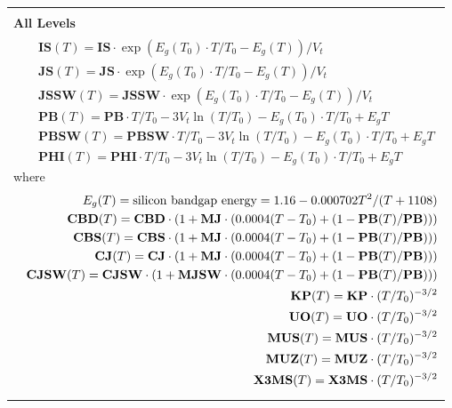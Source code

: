 


\small
\begin{longtable}[H]{>{\setlength{\hsize}{\textwidth}}W}
\hline \\
\bf All Levels \\

\begin{eqnarray*}
&& \mathbf{IS}(T) = \mathbf{IS}\cdot\exp\left(E_g(T_0)\cdot
T/T_0 - E_g(T)\right)/V_t \\
&& \mathbf{JS}(T) = \mathbf{JS}\cdot\exp\left(E_g(T_0)\cdot
T/T_0 - E_g(T)\right)/V_t \\
&& \mathbf{JSSW}(T) = \mathbf{JSSW}\cdot\exp\left(E_g(T_0)\cdot
T/T_0 - E_g(T)\right)/V_t \\
&& \mathbf{PB}(T) = \mathbf{PB}\cdot T/T_0 - 3V_t\ln(T/T_0) -
E_g(T_0)\cdot T/T_0 + E_g{T} \\
&& \mathbf{PBSW}(T) = \mathbf{PBSW}\cdot T/T_0 - 3V_t\ln(T/T_0) -
E_g(T_0)\cdot T/T_0 + E_g{T} \\
&& \mathbf{PHI}(T) = \mathbf{PHI}\cdot T/T_0 - 3V_t\ln(T/T_0) -
E_g(T_0)\cdot T/T_0 + E_g{T}
\end{eqnarray*}
where
\begin{eqnarray*}
&& E_g(T) = \mbox{\rm silicon bandgap energy} = 1.16 -
0.000702T^2 /(T + 1108) \\
&& \mathbf{CBD}(T) = \mathbf{CBD}\cdot(1 + \mathbf{MJ}\cdot
(0.0004(T - T_0) + (1 - \mathbf{PB}(T)/\mathbf{PB}))) \\
&& \mathbf{CBS}(T) = \mathbf{CBS}\cdot(1 + \mathbf{MJ}\cdot
(0.0004(T - T_0) + (1 - \mathbf{PB}(T)/\mathbf{PB}))) \\
&& \mathbf{CJ}(T) = \mathbf{CJ}\cdot(1 + \mathbf{MJ}\cdot
(0.0004(T - T_0) + (1 - \mathbf{PB}(T)/\mathbf{PB}))) \\
&& \mathbf{CJSW}(T) = \mathbf{CJSW}\cdot(1 + \mathbf{MJSW}\cdot
(0.0004(T - T_0) + (1 - \mathbf{PB}(T)/\mathbf{PB}))) \\
&& \mathbf{KP}(T) = \mathbf{KP}\cdot(T/T_0)^{-3/2} \\
&& \mathbf{UO}(T) = \mathbf{UO}\cdot(T/T_0)^{-3/2} \\
&& \mathbf{MUS}(T) = \mathbf{MUS}\cdot(T/T_0)^{-3/2} \\
&& \mathbf{MUZ}(T) = \mathbf{MUZ}\cdot(T/T_0)^{-3/2} \\
&& \mathbf{X3MS}(T) = \mathbf{X3MS}\cdot(T/T_0)^{-3/2}%
\end{eqnarray*}
\end{longtable}

